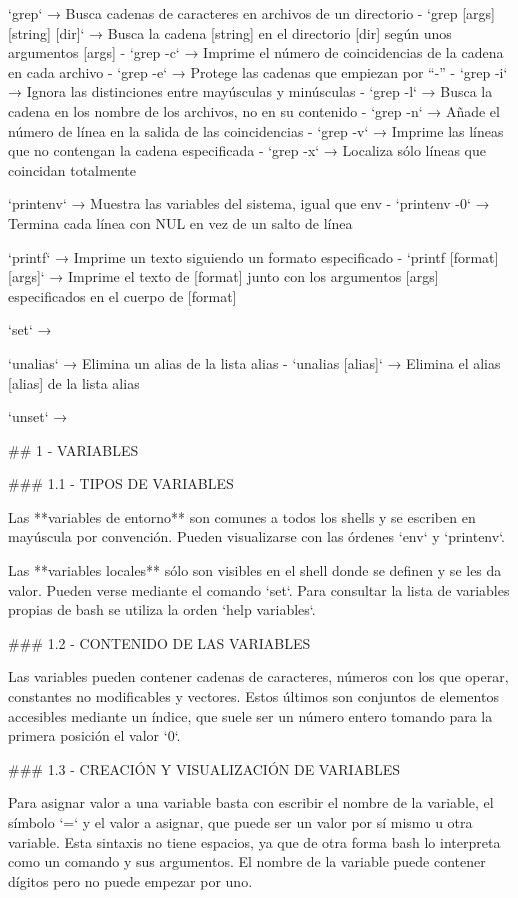 `grep` → Busca cadenas de caracteres en archivos de un directorio
- `grep [args] [string] [dir]` → Busca la cadena [string] en el directorio [dir] según unos argumentos [args]
- `grep -c` → Imprime el número de coincidencias de la cadena en cada archivo
- `grep -e` → Protege las cadenas que empiezan por “-”
- `grep -i` → Ignora las distinciones entre mayúsculas y minúsculas
- `grep -l` → Busca la cadena en los nombre de los archivos, no en su contenido
- `grep -n` → Añade el número de línea en la salida de las coincidencias
- `grep -v` → Imprime las líneas que no contengan la cadena especificada
- `grep -x` → Localiza sólo líneas que coincidan totalmente

`printenv` → Muestra las variables del sistema, igual que env
- `printenv -0` → Termina cada línea con NUL en vez de un salto de línea

`printf` → Imprime un texto siguiendo un formato especificado
- `printf [format][args]` → Imprime el texto de [format] junto con los argumentos [args] especificados en el cuerpo de [format]

`set` → 

`unalias` → Elimina un alias de la lista alias
- `unalias [alias]` → Elimina el alias [alias] de la lista alias

`unset` → 

## 1 - VARIABLES

### 1.1 - TIPOS DE VARIABLES

Las **variables de entorno** son comunes a todos los shells y se escriben en mayúscula por convención. Pueden visualizarse con las órdenes `env` y `printenv`.

Las **variables locales** sólo son visibles en el shell donde se definen y se les da valor. Pueden verse mediante el comando `set`. Para consultar la lista de variables propias de bash se utiliza la orden `help variables`.

### 1.2 - CONTENIDO DE LAS VARIABLES

Las variables pueden contener cadenas de caracteres, números con los que operar, constantes no modificables  y vectores. Estos últimos son conjuntos de elementos accesibles mediante un índice, que suele ser un número entero tomando para la primera posición el valor `0`.

### 1.3 - CREACIÓN Y VISUALIZACIÓN DE VARIABLES

Para asignar valor a una variable basta con escribir el nombre de la variable, el símbolo `=` y el valor a asignar, que puede ser un valor por sí mismo u otra variable. Esta sintaxis no tiene espacios, ya que de otra forma bash lo interpreta como un comando y sus argumentos. El nombre de la variable puede contener dígitos pero no puede empezar por uno.


